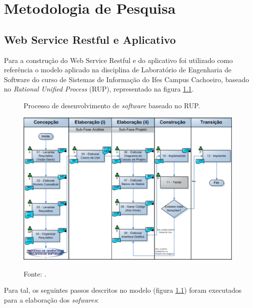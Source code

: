 \chapter{\textbf{Metodologia de Pesquisa}} %
\sloppy %

\section{Web Service Restful e Aplicativo}

Para a construção do Web Service Restful e do aplicativo foi utilizado como referência o modelo aplicado na disciplina de Laboratório de Engenharia de Software do curso de Sistemas de Informação do Ifes Campus Cachoeiro, baseado no \textit{Rational Unified Process} (RUP), representado na figura \ref{figura:rup}.

\begin{figure}[h]
	\caption{Processo de desenvolvimento de \textit{software} baseado no RUP.}
	\centering %
	\includegraphics[width=16cm]{resources/pds_rup.png} %
	\label{figura:rup}	
	\caption*{Fonte: .}
\end{figure}

Para tal, os seguintes passos descritos no modelo (figura \ref{figura:rup}) foram executados para a elaboração dos \textit{sofwares}:

